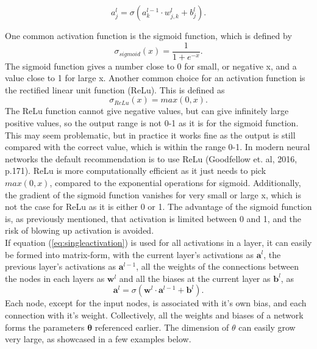 \documentclass{article}
\begin{document}
\begin{equation}\label{eq:singleactivation}
    a^l_j = \sigma(a^{l-1}_k\cdot w_{j,k}^l + b^l_j).
\end{equation}
\iffalse
\begin{figure}[H]
    \centering
    \texttt{[image: Figurer/NN\_slice.png]}
    \caption{Caption}
    \label{fig:my_label}
\end{figure}
\fi
\noindent One common activation function is the sigmoid function, which is defined by
\begin{equation}\label{eq:sigmoid}
    \sigma_{sigmoid}(x) = \frac{1}{1+e^{-x}}. 
\end{equation}
The sigmoid function gives a number close to 0 for small, or negative x, and a value close to 1 for large x. Another common choice for an activation function is the rectified linear unit function (ReLu). This is defined as
\begin{equation}\label{eq:ReLu}
    \sigma_{ReLu}(x) = max(0,x). 
\end{equation}
The ReLu function cannot give negative values, but can give infinitely large positive values, so the output range is not 0-1 as it is for the sigmoid function. This may seem problematic, but in practice it works fine as the output is still compared with the correct value, which is within the range 0-1. In modern neural networks the default recommendation is to use ReLu (Goodfellow et. al, 2016, p.171). ReLu is more computationally efficient as it just needs to pick $max(0, x)$, compared to the exponential operations for sigmoid. Additionally, the gradient of the sigmoid function vanishes for very small or large x, which is not the case for ReLu as it is either 0 or 1. The advantage of the sigmoid function is, as previously mentioned, that activation is limited between 0 and 1, and the risk of blowing up activation is avoided. \\

\noindent If equation (\ref{eq:singleactivation}) is used for all activations in a layer, it can easily be formed into matrix-form, with the current layer's activations as $\mathbf{a}^l$, the previous layer's activations as $\mathbf{a}^{l-1}$, all the weights of the connections between the nodes in each layers as $\mathbf{w}^l$ and all the biases at the current layer as $\mathbf{b}^l$, as
\begin{equation}\label{eq:act}
    \mathbf{a}^l = \sigma(\mathbf{w}^l\cdot\mathbf{a}^{l-1} + \mathbf{b}^l).
\end{equation}
Each node, except for the input nodes, is associated with it's own bias, and each connection with it's weight. Collectively, all the weights and biases of a network forms the parameters $\mathbf{\theta}$ referenced earlier. The dimension of $\theta$ can easily grow very large, as showcased in a few examples below.\\
\end{document}
